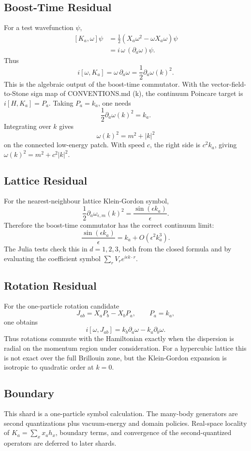 \subsection{Boost-Time Residual}

For a test wavefunction \(\psi\),
\[
\begin{aligned}
  [K_a,\omega]\psi
  &=
  \frac{1}{2}(X_a\omega^2-\omega X_a\omega)\psi\\
  &=
  i\,\omega\,(\partial_a\omega)\psi.
\end{aligned}
\]
Thus
\[
  i[\omega,K_a]
  =
  \omega\,\partial_a\omega
  =
  \frac{1}{2}\partial_a\omega(k)^2.
\]
This is the algebraic output of the boost-time commutator.  With the
vector-field-to-Stone sign map of CONVENTIONS.md (k), the continuum Poincare
target is \(i[H,K_a]=P_a\).  Taking \(P_a=k_a\), one needs
\[
  \frac{1}{2}\partial_a\omega(k)^2=k_a.
\]
Integrating over \(k\) gives
\[
  \omega(k)^2=m^2+|k|^2
\]
on the connected low-energy patch.  With speed \(c\), the right side is
\(c^2k_a\), giving \(\omega(k)^2=m^2+c^2|k|^2\).

\subsection{Lattice Residual}

For the nearest-neighbour lattice Klein-Gordon symbol,
\[
  \frac{1}{2}\partial_a\omega_{\epsilon,m}(k)^2
  =
  \frac{\sin(\epsilon k_a)}{\epsilon}.
\]
Therefore the boost-time commutator has the correct continuum limit:
\[
  \frac{\sin(\epsilon k_a)}{\epsilon}=k_a+O(\epsilon^2k_a^3).
\]
The Julia tests check this in \(d=1,2,3\), both from the closed formula and by
evaluating the coefficient symbol
\(\sum_rV_re^{i\epsilon k\cdot r}\).

\subsection{Rotation Residual}

For the one-particle rotation candidate
\[
  J_{ab}=X_aP_b-X_bP_a,\qquad P_a=k_a,
\]
one obtains
\[
  i[\omega,J_{ab}]
  =
  k_b\partial_a\omega-k_a\partial_b\omega.
\]
Thus rotations commute with the Hamiltonian exactly when the dispersion is
radial on the momentum region under consideration.  For a hypercubic lattice
this is not exact over the full Brillouin zone, but the Klein-Gordon expansion
is isotropic to quadratic order at \(k=0\).

\subsection{Boundary}

This shard is a one-particle symbol calculation.  The many-body generators are
second quantizations plus vacuum-energy and domain policies.  Real-space
locality of \(K_a=\sum_xx_ah_x\), boundary terms, and convergence of the
second-quantized operators are deferred to later shards.
